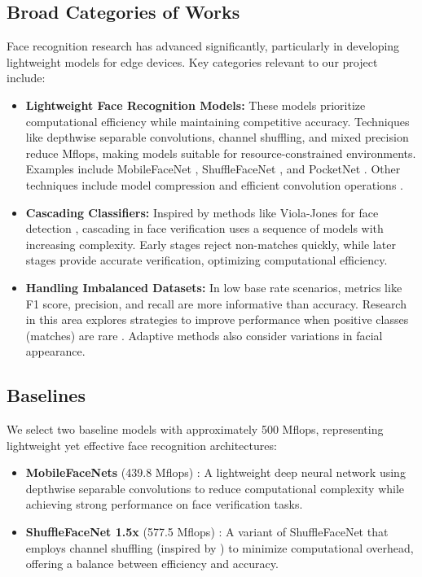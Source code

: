 \documentclass[times,10pt,twocolumn]{article}
\begin{document}
\subsection{Broad Categories of Works}
Face recognition research has advanced significantly, particularly in developing lightweight models for edge devices. Key categories relevant to our project include:

\begin{itemize}
    \item \textbf{Lightweight Face Recognition Models:} These models prioritize computational efficiency while maintaining competitive accuracy. Techniques like depthwise separable convolutions, channel shuffling, and mixed precision reduce Mflops, making models suitable for resource-constrained environments. Examples include MobileFaceNet \cite{mobilefacenet}, ShuffleFaceNet \cite{shufflefacenet}, and PocketNet \cite{pocketnet}. Other techniques include model compression \cite{facecompression} and efficient convolution operations \cite{mixconv}.
    \item \textbf{Cascading Classifiers:} Inspired by methods like Viola-Jones for face detection \cite{violarjones}, cascading in face verification uses a sequence of models with increasing complexity. Early stages reject non-matches quickly, while later stages provide accurate verification, optimizing computational efficiency.
    \item \textbf{Handling Imbalanced Datasets:} In low base rate scenarios, metrics like F1 score, precision, and recall are more informative than accuracy. Research in this area explores strategies to improve performance when positive classes (matches) are rare \cite{imbalancedlearning}. Adaptive methods \cite{adaptiveface} also consider variations in facial appearance.
\end{itemize}

\subsection{Baselines}
We select two baseline models with approximately 500 Mflops, representing lightweight yet effective face recognition architectures:

\begin{itemize}
    \item \textbf{MobileFaceNets} (439.8 Mflops) \cite{mobilefacenet}: A lightweight deep neural network using depthwise separable convolutions to reduce computational complexity while achieving strong performance on face verification tasks.
    \item \textbf{ShuffleFaceNet 1.5x} (577.5 Mflops) \cite{shufflefacenet}: A variant of ShuffleFaceNet that employs channel shuffling (inspired by \cite{shufflenetv2}) to minimize computational overhead, offering a balance between efficiency and accuracy.
\end{itemize}
\end{document}
